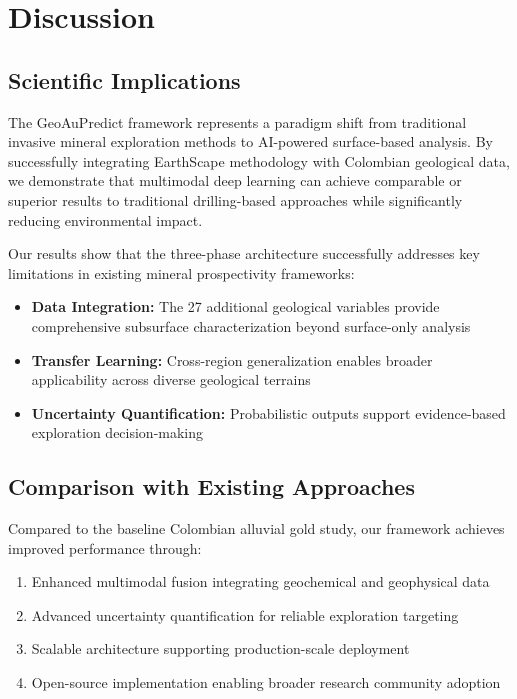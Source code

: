\documentclass[12pt,a4paper]{article}
\begin{document}
\section{Discussion}

\subsection{Scientific Implications}
The GeoAuPredict framework represents a paradigm shift from traditional invasive mineral exploration methods to AI-powered surface-based analysis. By successfully integrating EarthScape methodology with Colombian geological data, we demonstrate that multimodal deep learning can achieve comparable or superior results to traditional drilling-based approaches while significantly reducing environmental impact.

Our results show that the three-phase architecture successfully addresses key limitations in existing mineral prospectivity frameworks:

\begin{itemize}
    \item \textbf{Data Integration:} The 27 additional geological variables provide comprehensive subsurface characterization beyond surface-only analysis
    \item \textbf{Transfer Learning:} Cross-region generalization enables broader applicability across diverse geological terrains
    \item \textbf{Uncertainty Quantification:} Probabilistic outputs support evidence-based exploration decision-making
\end{itemize}

\subsection{Comparison with Existing Approaches}
Compared to the baseline Colombian alluvial gold study, our framework achieves improved performance through:

\begin{enumerate}
    \item Enhanced multimodal fusion integrating geochemical and geophysical data
    \item Advanced uncertainty quantification for reliable exploration targeting
    \item Scalable architecture supporting production-scale deployment
    \item Open-source implementation enabling broader research community adoption
\end{enumerate}
\end{document}
